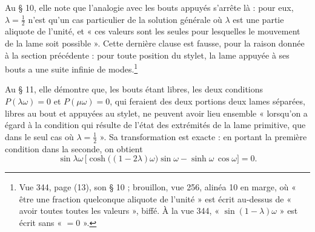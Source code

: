 \documentclass[11pt,a4paper]{article}
\begin{document}
Au § 10, elle note que l'analogie avec les bouts appuyés s'arrête là : pour eux, $\lambda=\frac12$ n'est qu'un cas particulier de la solution générale où $\lambda$ est une partie aliquote de l'unité, et « ces valeurs sont les seules pour lesquelles le mouvement de la lame soit possible ». Cette dernière clause est fausse, pour la raison donnée à la section précédente : pour toute position du stylet, la lame appuyée à ses bouts a une suite infinie de modes.\footnote{Vue 344, page (13), son § 10 ; brouillon, vue 256, alinéa 10 en marge, où « être une fraction quelconque aliquote de l'unité » est écrit au-dessus de « avoir toutes toutes les valeurs », biffé. À la vue 344, « $\sin(1-\lambda)\omega$ » est écrit sans « $=0$ ».}

Au § 11, elle démontre que, les bouts étant libres, les deux conditions $P(\lambda\omega)=0$ et $P(\mu\omega)=0$, qui feraient des deux portions deux lames séparées, libres au bout et appuyées au stylet, ne peuvent avoir lieu ensemble « lorsqu'on a égard à la condition qui résulte de l'état des extrémités de la lame primitive, que dans le seul cas où $\lambda=\frac12$ ». Sa transformation est exacte : en portant la première condition dans la seconde, on obtient
\[
\sin\lambda\omega\,\bigl[\cosh\bigl((1-2\lambda)\omega\bigr)\sin\omega-\sinh\omega\,\cos\omega\bigr]=0 .
\]
\end{document}
